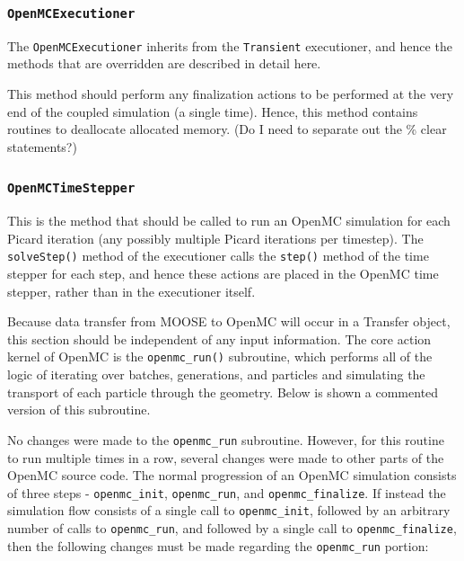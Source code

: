 \documentclass[10pt]{article}
\newcounter{subsubsubsection}[subsubsection]
\numberwithin{equation}{section} %
\begin{document}
\subsubsection{{\tt OpenMCExecutioner}}
The {\tt OpenMCExecutioner} inherits from the {\tt Transient} executioner, and hence the methods that are overridden are described in detail here.

This method should perform any finalization actions to be performed at the very end of the coupled simulation (a single time). Hence, this method contains routines to deallocate allocated memory. (Do I need to separate out the \% clear statements?)

\subsubsection{{\tt OpenMCTimeStepper}}

This is the method that should be called to run an OpenMC simulation for each Picard iteration (any possibly multiple Picard iterations per timestep). The {\tt solveStep()} method of the executioner calls the {\tt step()} method of the time stepper for each step, and hence these actions are placed in the OpenMC time stepper, rather than in the executioner itself.  

Because data transfer from MOOSE to OpenMC will occur in a Transfer object, this section should be independent of any input information. The core action kernel of OpenMC is the {\tt openmc\_run()} subroutine, which performs all of the logic of iterating over batches, generations, and particles and simulating the transport of each particle through the geometry. Below is shown a commented version of this subroutine. 

No changes were made to the {\tt openmc\_run} subroutine. However, for this routine to run multiple times in a row, several changes were made to other parts of the OpenMC source code. The normal progression of an OpenMC simulation consists of three steps - {\tt openmc\_init}, {\tt openmc\_run}, and {\tt openmc\_finalize}. If instead the simulation flow consists of a single call to {\tt openmc\_init}, followed by an arbitrary number of calls to {\tt openmc\_run}, and followed by a single call to {\tt openmc\_finalize}, then the following changes must be made regarding the {\tt openmc\_run} portion:
\end{document}
